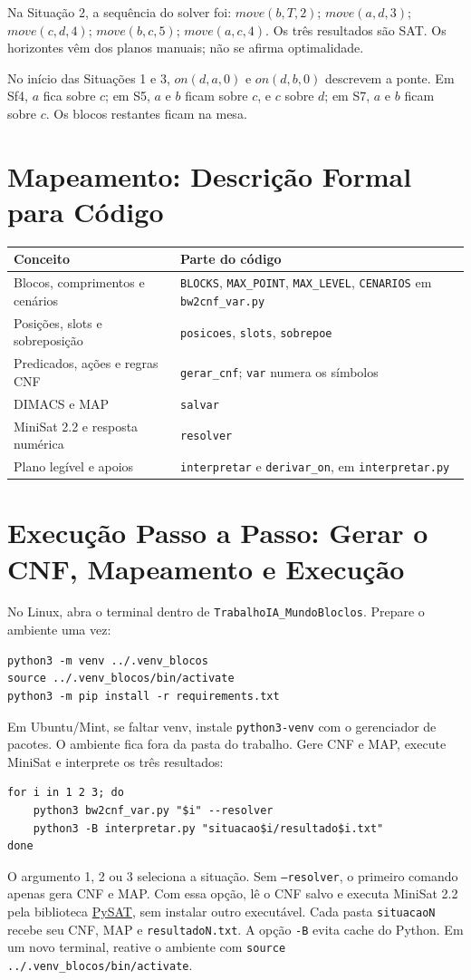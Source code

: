 \documentclass[11pt,a4paper]{article}
\newcommand{\code}[1]{\texttt{#1}}
\begin{document}
Na Situação 2, a sequência do solver foi: $move(b,T,2)$; $move(a,d,3)$; $move(c,d,4)$; $move(b,c,5)$; $move(a,c,4)$. Os três resultados são SAT. Os horizontes vêm dos planos manuais; não se afirma optimalidade.

No início das Situações 1 e 3, $on(d,a,0)$ e $on(d,b,0)$ descrevem a ponte. Em Sf4, $a$ fica sobre $c$; em S5, $a$ e $b$ ficam sobre $c$, e $c$ sobre $d$; em S7, $a$ e $b$ ficam sobre $c$. Os blocos restantes ficam na mesa.

\newpage
\section{Mapeamento: Descrição Formal para Código}
\begin{tabularx}{\linewidth}{L{5cm}Y}
\toprule Conceito & Parte do código \\ \midrule
Blocos, comprimentos e cenários & \code{BLOCKS}, \code{MAX\_POINT}, \code{MAX\_LEVEL}, \code{CENARIOS} em \code{bw2cnf\_var.py}\\
Posições, slots e sobreposição & \code{posicoes}, \code{slots}, \code{sobrepoe}\\
Predicados, ações e regras CNF & \code{gerar\_cnf}; \code{var} numera os símbolos\\
DIMACS e MAP & \code{salvar}\\
MiniSat 2.2 e resposta numérica & \code{resolver}\\
Plano legível e apoios & \code{interpretar} e \code{derivar\_on}, em \code{interpretar.py}\\ \bottomrule
\end{tabularx}

\section{Execução Passo a Passo: Gerar o CNF, Mapeamento e Execução}
No Linux, abra o terminal dentro de \code{TrabalhoIA\_MundoBloclos}. Prepare o ambiente uma vez:
\begin{lstlisting}
python3 -m venv ../.venv_blocos
source ../.venv_blocos/bin/activate
python3 -m pip install -r requirements.txt
\end{lstlisting}
Em Ubuntu/Mint, se faltar venv, instale \code{python3-venv} com o gerenciador de pacotes. O ambiente fica fora da pasta do trabalho. Gere CNF e MAP, execute MiniSat e interprete os três resultados:
\begin{lstlisting}
for i in 1 2 3; do
    python3 bw2cnf_var.py "$i" --resolver
    python3 -B interpretar.py "situacao$i/resultado$i.txt"
done
\end{lstlisting}
O argumento 1, 2 ou 3 seleciona a situação. Sem \code{--resolver}, o primeiro comando apenas gera CNF e MAP. Com essa opção, lê o CNF salvo e executa MiniSat 2.2 pela biblioteca \href{https://pysathq.github.io/docs/html/api/solvers.html}{PySAT}, sem instalar outro executável. Cada pasta \code{situacaoN} recebe seu CNF, MAP e \code{resultadoN.txt}. A opção \code{-B} evita cache do Python. Em um novo terminal, reative o ambiente com \code{source ../.venv\_blocos/bin/activate}.
\end{document}

